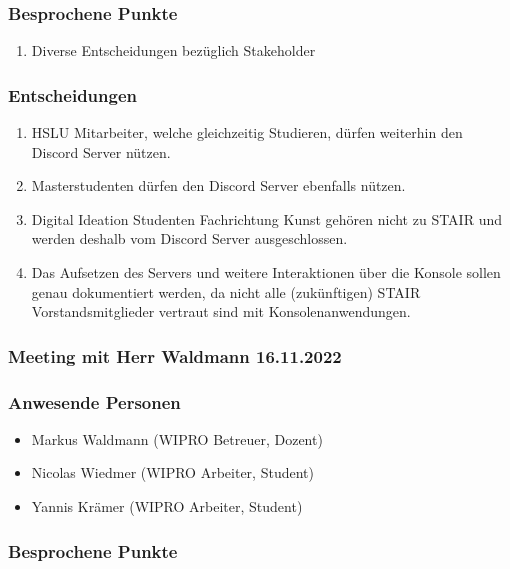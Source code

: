 \documentclass[a4paper, table]{article}
\begin{document}
\subsubsection*{Besprochene Punkte}

\begin{enumerate}
    \item Diverse Entscheidungen bezüglich Stakeholder
\end{enumerate}

\subsubsection*{Entscheidungen}

\begin{enumerate}
    \item HSLU Mitarbeiter, welche gleichzeitig Studieren, dürfen weiterhin den Discord Server nützen.
    \item Masterstudenten dürfen den Discord Server ebenfalls nützen.
    \item Digital Ideation Studenten Fachrichtung Kunst gehören nicht zu STAIR und werden deshalb vom Discord Server ausgeschlossen.
    \item Das Aufsetzen des Servers und weitere Interaktionen über die Konsole sollen genau dokumentiert werden, da nicht alle (zukünftigen) STAIR Vorstandsmitglieder vertraut sind mit Konsolenanwendungen.
\end{enumerate}

\newpage
\subsubsection{Meeting mit Herr Waldmann 16.11.2022}

\subsubsection*{Anwesende Personen}

\begin{itemize}
    \item Markus Waldmann (WIPRO Betreuer, Dozent)
    \item Nicolas Wiedmer (WIPRO Arbeiter, Student)
    \item Yannis Krämer (WIPRO Arbeiter, Student)
\end{itemize}

\subsubsection*{Besprochene Punkte}
\end{document}
